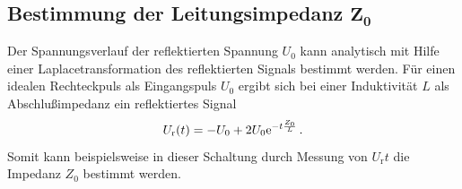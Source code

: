 \subsection%
    [Bestimmung der Leitungsimpedanz $Z_0$]%
    {Bestimmung der Leitungsimpedanz $\mathbf{Z_0}$} %
\label{sub:impedanz}
Der Spannungsverlauf der reflektierten Spannung $U_0$ kann analytisch mit
Hilfe einer Laplacetransformation des reflektierten Signals bestimmt werden.
Für einen idealen Rechteckpuls als Eingangspuls $U_0$ ergibt sich bei einer
Induktivität $L$ als Abschlußimpedanz ein reflektiertes Signal
\begin{equation*}
    U_\text{r}(t) = - U_0 + 2U_0\mathrm{e}^{-t \frac{Z_0}{L}}\,.
\end{equation*}
Somit kann beispielsweise in dieser Schaltung durch Messung von $U_\text{r}{t}$
die Impedanz $Z_0$ bestimmt werden.

